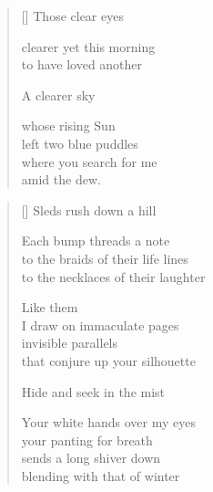 \documentclass[14pt]{extbook}
\newcommand*{\centeredornament}{\centerline{\pgfornament[width=6cm]{88}}}
\begin{document}

\settowidth{\versewidth}{where you search for me}

\begin{verse}[\versewidth]
  Those clear eyes

  clearer yet this morning \\
  to have loved another

  A clearer sky

  whose rising Sun \\
  left two blue puddles \\
  where you search for me \\
  amid the dew.
\end{verse}


\newpage

\vspace*{-15mm}
\centeredornament
\vspace*{-7mm}


\settowidth{\versewidth}{to the necklaces of their laughter}

\begin{verse}[\versewidth]
  Sleds rush down a hill

  Each bump threads a note \\
  to the braids of their life lines \\
  to the necklaces of their laughter

  Like them \\
  I draw on immaculate pages \\
  invisible parallels \\
  that conjure up your silhouette

  Hide and seek in the mist

  Your white hands over my eyes \\
  your panting for breath \\
  sends a long shiver down \\
  blending with that of winter
\end{verse}

\newpage

\settowidth{\versewidth}{in the calm stream of your words}
\end{document}
